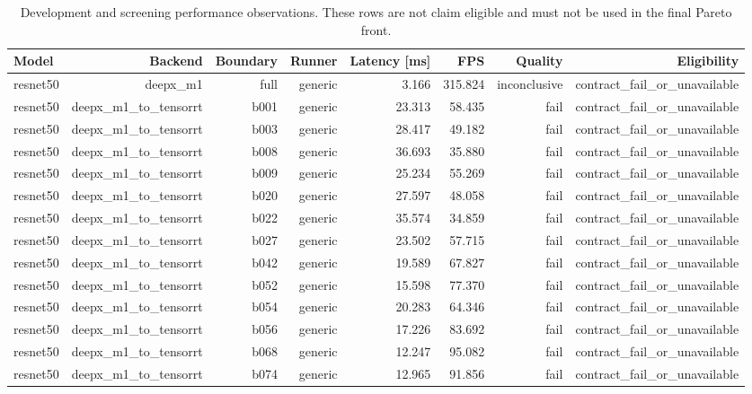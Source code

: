\begin{table}[t]
\centering
\small
\caption{Development and screening performance observations. These rows are not claim eligible and must not be used in the final Pareto front.}
\label{tab:screening-performance-observations}
\begin{tabular}{lrrrrrrr}
\toprule
Model & Backend & Boundary & Runner & Latency [ms] & FPS & Quality & Eligibility \\
\midrule
resnet50 & deepx\_m1 & full & generic & 3.166 & 315.824 & inconclusive & contract\_fail\_or\_unavailable \\
resnet50 & deepx\_m1\_to\_tensorrt & b001 & generic & 23.313 & 58.435 & fail & contract\_fail\_or\_unavailable \\
resnet50 & deepx\_m1\_to\_tensorrt & b003 & generic & 28.417 & 49.182 & fail & contract\_fail\_or\_unavailable \\
resnet50 & deepx\_m1\_to\_tensorrt & b008 & generic & 36.693 & 35.880 & fail & contract\_fail\_or\_unavailable \\
resnet50 & deepx\_m1\_to\_tensorrt & b009 & generic & 25.234 & 55.269 & fail & contract\_fail\_or\_unavailable \\
resnet50 & deepx\_m1\_to\_tensorrt & b020 & generic & 27.597 & 48.058 & fail & contract\_fail\_or\_unavailable \\
resnet50 & deepx\_m1\_to\_tensorrt & b022 & generic & 35.574 & 34.859 & fail & contract\_fail\_or\_unavailable \\
resnet50 & deepx\_m1\_to\_tensorrt & b027 & generic & 23.502 & 57.715 & fail & contract\_fail\_or\_unavailable \\
resnet50 & deepx\_m1\_to\_tensorrt & b042 & generic & 19.589 & 67.827 & fail & contract\_fail\_or\_unavailable \\
resnet50 & deepx\_m1\_to\_tensorrt & b052 & generic & 15.598 & 77.370 & fail & contract\_fail\_or\_unavailable \\
resnet50 & deepx\_m1\_to\_tensorrt & b054 & generic & 20.283 & 64.346 & fail & contract\_fail\_or\_unavailable \\
resnet50 & deepx\_m1\_to\_tensorrt & b056 & generic & 17.226 & 83.692 & fail & contract\_fail\_or\_unavailable \\
resnet50 & deepx\_m1\_to\_tensorrt & b068 & generic & 12.247 & 95.082 & fail & contract\_fail\_or\_unavailable \\
resnet50 & deepx\_m1\_to\_tensorrt & b074 & generic & 12.965 & 91.856 & fail & contract\_fail\_or\_unavailable \\

\end{tabular}
\end{table}
